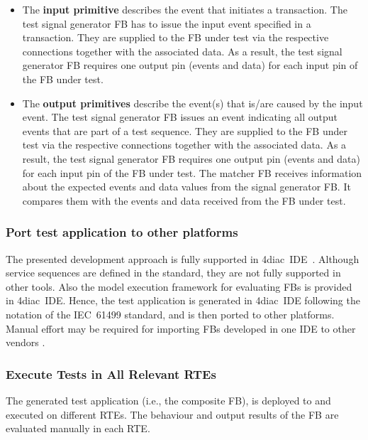 \begin{bibunit}
\begin{itemize}
    \item The \textbf{input primitive} describes the event that initiates a transaction. 
    The test signal generator FB has to issue the input event specified in a transaction. They are supplied to the FB under test via the respective connections together with the associated data. As a result, the test signal generator FB requires one output pin (events and data) for each input pin of the FB under test. 
    
    \item The \textbf{output primitives} describe the event(s) that is/are caused by the input event.
    The test signal generator FB issues an event indicating all output events that are part of a test sequence. They are supplied to the FB under test via the respective connections together with the associated data. As a result, the test signal generator FB requires one output pin (events and data) for each input pin of the FB under test. The matcher FB receives information about the expected events and data values from the signal generator FB. It compares them with the events and data received from the FB under test.
\end{itemize}

\subsubsection{Port test application to other platforms}
The presented development approach is fully supported in 4diac~IDE~\cite{eclipse4diac}. Although service sequences are defined in the standard, they are not fully supported in other tools. Also the model execution framework for evaluating FBs is provided in 4diac~IDE. Hence, the test application is generated in 4diac~IDE following the notation of the IEC~61499 standard, and is then ported to other platforms. Manual effort may be required for importing FBs developed in one IDE to other vendors \cite{cheng_pang_portability}.

\subsubsection{Execute Tests in All Relevant RTEs}
The generated test application (i.e., the composite FB), is deployed to and executed on different RTEs. The behaviour and output results of the FB are evaluated manually in each RTE.


\end{bibunit}
